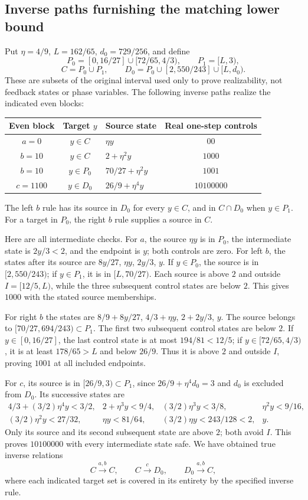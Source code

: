 \documentclass[11pt,reqno]{amsart}
\numberwithin{equation}{section}
\theoremstyle{definition}
\begin{document}
\subsection*{Inverse paths furnishing the matching lower bound}
Put $\eta=4/9$, $L=162/65$, $d_0=729/256$, and define
\[
 P_0=[0,16/27]\cup[72/65,4/3),\qquad P_1=[L,3),
\]
\[
 C=P_0\cup P_1,\qquad
 D_0=P_0\cup[2,550/243]\cup[L,d_0).
\]
These are subsets of the original interval used only to prove
realizability, not feedback states or phase variables. The following
inverse paths realize the indicated even blocks:
\begin{center}
\begin{tabular}{cclc}
\toprule
Even block&Target $y$&Source state&Real one-step controls\\
\midrule
$a=0$&$y\in C$&$\eta y$&$00$\\
$b=10$&$y\in C$&$2+\eta^2y$&$1000$\\
$b=10$&$y\in P_0$&$70/27+\eta^2y$&$1001$\\
$c=1100$&$y\in D_0$&$26/9+\eta^4y$&$10100000$\\
\bottomrule
\end{tabular}
\end{center}
The left $b$ rule has its source in $D_0$ for every $y\in C$,
and in $C\cap D_0$ when $y\in P_1$. For a target in $P_0$,
the right $b$ rule supplies a source in $C$.

Here are all intermediate checks. For $a$, the source
$\eta y$ is in $P_0$, the intermediate state is $2y/3<2$,
and the endpoint is $y$; both controls are zero.
For left $b$, the states after its source are
$8y/27$, $\eta y$, $2y/3$, $y$. If $y\in P_0$, the
source is in $[2,550/243)$; if $y\in P_1$, it is in
$[L,70/27)$. Each source is above $2$ and outside
$I=[12/5,L)$, while the three subsequent control states are
below $2$. This gives $1000$ with the stated source memberships.

For right $b$ the states are
$8/9+8y/27$, $4/3+\eta y$, $2+2y/3$, $y$.
The source belongs to $[70/27,694/243)\subset P_1$.
The first two subsequent control states are below $2$.
If $y\in[0,16/27]$, the last control state is at most
$194/81<12/5$; if $y\in[72/65,4/3)$, it is at least
$178/65>L$ and below $26/9$. Thus it is above $2$ and
outside $I$, proving $1001$ at all included endpoints.

For $c$, its source is in $[26/9,3)\subset P_1$, since
$26/9+\eta^4d_0=3$ and $d_0$ is excluded from $D_0$.
Its successive states are
\[
\begin{array}{llll}
4/3+(3/2)\eta^4y<3/2,&2+\eta^3y<9/4,&
(3/2)\eta^3y<3/8,&\eta^2y<9/16,\\
(3/2)\eta^2y<27/32,&\eta y<81/64,&
(3/2)\eta y<243/128<2,&y.
\end{array}
\]
Only its source and its second subsequent state are above $2$;
both avoid $I$. This proves $10100000$ with every intermediate
state safe. We have obtained true inverse relations
\[
 C\xrightarrow{a,b}C,\qquad C\xrightarrow cD_0,
 \qquad D_0\xrightarrow{a,b}C,
\]
where each indicated target set is covered in its entirety by the
specified inverse rule.
\end{document}
